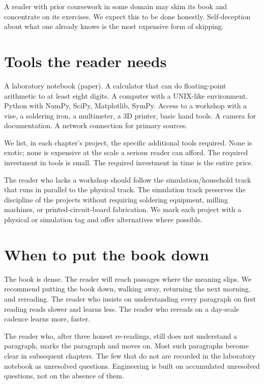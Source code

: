 A reader with prior coursework in some domain may skim its book and concentrate on its exercises. We expect this to be done honestly. Self-deception about what one already knows is the most expensive form of skipping.

\section*{Tools the reader needs}

A laboratory notebook (paper). A calculator that can do floating-point arithmetic to at least eight digits. A computer with a UNIX-like environment. Python with NumPy, SciPy, Matplotlib, SymPy. Access to a workshop with a vise, a soldering iron, a multimeter, a 3D printer, basic hand tools. A camera for documentation. A network connection for primary sources.

We list, in each chapter's project, the specific additional tools required. None is exotic; none is expensive at the scale a serious reader can afford. The required investment in tools is small. The required investment in time is the entire price.

The reader who lacks a workshop should follow the simulation/household track that runs in parallel to the physical track. The simulation track preserves the discipline of the projects without requiring soldering equipment, milling machines, or printed-circuit-board fabrication. We mark each project with a physical or simulation tag and offer alternatives where possible.

\section*{When to put the book down}

The book is dense. The reader will reach passages where the meaning slips. We recommend putting the book down, walking away, returning the next morning, and rereading. The reader who insists on understanding every paragraph on first reading reads slower and learns less. The reader who rereads on a day-scale cadence learns more, faster.

The reader who, after three honest re-readings, still does not understand a paragraph, marks the paragraph and moves on. Most such paragraphs become clear in subsequent chapters. The few that do not are recorded in the laboratory notebook as unresolved questions. Engineering is built on accumulated unresolved questions, not on the absence of them.
